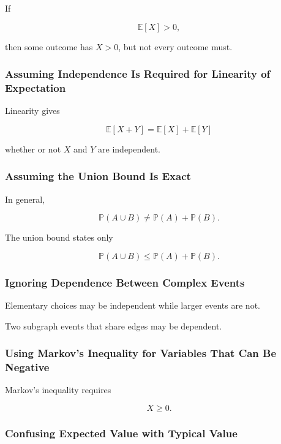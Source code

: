 If

\[
\mathbb{E}[X]>0,
\]

then some outcome has \(X>0\), but not every outcome must.

\subsubsection{Assuming Independence Is Required for Linearity of Expectation}

Linearity gives

\[
\mathbb{E}[X+Y]
=
\mathbb{E}[X]
+
\mathbb{E}[Y]
\]

whether or not \(X\) and \(Y\) are independent.

\subsubsection{Assuming the Union Bound Is Exact}

In general,

\[
\mathbb{P}(A\cup B)
\neq
\mathbb{P}(A)+\mathbb{P}(B).
\]

The union bound states only

\[
\mathbb{P}(A\cup B)
\leq
\mathbb{P}(A)+\mathbb{P}(B).
\]

\subsubsection{Ignoring Dependence Between Complex Events}

Elementary choices may be independent while larger events are not.

Two subgraph events that share edges may be dependent.

\subsubsection{Using Markov's Inequality for Variables That Can Be Negative}

Markov's inequality requires

\[
X\geq0.
\]

\subsubsection{Confusing Expected Value with Typical Value}

